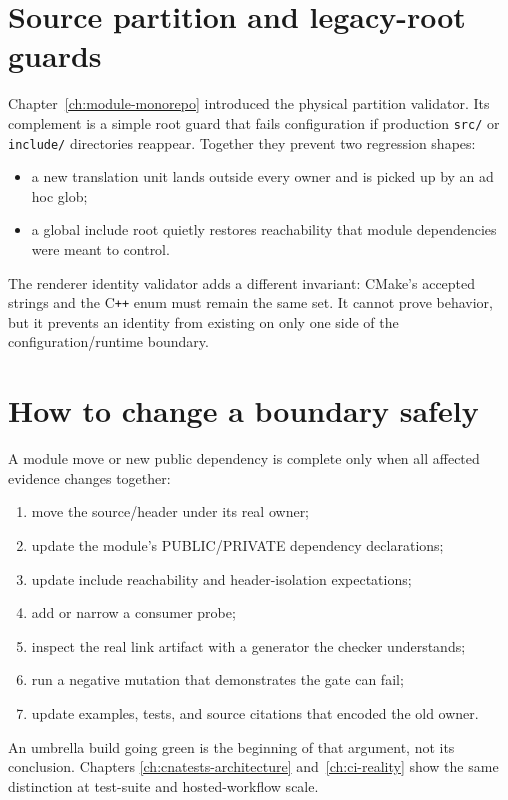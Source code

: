 \section{Source partition and legacy-root guards}

Chapter~\ref{ch:module-monorepo} introduced the physical partition validator.  Its complement is a
simple root guard that fails configuration if production \texttt{src/} or \texttt{include/}
directories reappear.  Together they prevent two regression shapes:

\begin{itemize}
  \item a new translation unit lands outside every owner and is picked up by an ad hoc glob;
  \item a global include root quietly restores reachability that module dependencies were meant to
        control.
\end{itemize}

The renderer identity validator adds a different invariant: CMake's accepted strings and the
C\texttt{++} enum must remain the same set.  It cannot prove behavior, but it prevents an identity
from existing on only one side of the configuration/runtime boundary.

\section{How to change a boundary safely}

A module move or new public dependency is complete only when all affected evidence changes
together:

\begin{enumerate}
  \item move the source/header under its real owner;
  \item update the module's PUBLIC/PRIVATE dependency declarations;
  \item update include reachability and header-isolation expectations;
  \item add or narrow a consumer probe;
  \item inspect the real link artifact with a generator the checker understands;
  \item run a negative mutation that demonstrates the gate can fail;
  \item update examples, tests, and source citations that encoded the old owner.
\end{enumerate}

An umbrella build going green is the beginning of that argument, not its conclusion.  Chapters
\ref{ch:cnatests-architecture} and~\ref{ch:ci-reality} show the same distinction at test-suite and
hosted-workflow scale.
